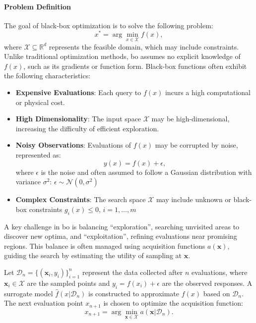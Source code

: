 \paragraph{Problem Definition}

The goal of black-box optimization is to solve the following problem:  
\[
x^* = \arg\min_{x \in \mathcal{X}} f(x),
\]  
where $\mathcal{X} \subseteq \mathbb{R}^d$ represents the feasible domain, which may include constraints. Unlike traditional optimization methods, \ac{bo} assumes no explicit knowledge of \( f(x) \), such as its gradients or function form.  Black-box functions often exhibit the following characteristics:  
\begin{itemize}
    \item \textbf{Expensive Evaluations}: Each query to \( f(x) \) incurs a high computational or physical cost. 
    \item \textbf{High Dimensionality}: The input space \( \mathcal{X} \) may be high-dimensional, increasing the difficulty of efficient exploration. 
    \item \textbf{Noisy Observations}: Evaluations of \( f(x) \) may be corrupted by noise, represented as:  
   \[
   y(x) = f(x) + \epsilon,
   \]  
   where $\epsilon$ is the noise and often assumed to follow a Gaussian distribution with variance $\sigma^2$: $\epsilon \sim \mathcal{N}(0, \sigma^2)$
\item \textbf{Complex Constraints}: The search space \( \mathcal{X} \) may include unknown or black-box constraints \( g_i(x) \leq 0 \), \( i = 1, \dots, m \)
\end{itemize}


A key challenge in \ac{bo} is balancing ``exploration'', searching unvisited areas to discover new optima, and ``exploitation'', refining evaluations near promising regions. This balance is often managed using acquisition functions \( a(\mathbf{x}) \), guiding the search by estimating the utility of sampling at \( \mathbf{x} \).  


Let \( \mathcal{D}_n = \{(\mathbf{x}_i, y_i)\}_{i=1}^n \) represent the data collected after \( n \) evaluations, where \( \mathbf{x}_i \in \mathcal{X} \) are the sampled points and \( y_i = f(x_i) + \epsilon \) are the observed responses. A surrogate model \( \hat{f}(x  \vert  \mathcal{D}_n) \) is constructed to approximate \( f(x) \) based on \( \mathcal{D}_n \). The next evaluation point \( x_{n+1} \) is chosen to optimize the acquisition function:  
\[
x_{n+1} = \arg\min_{\mathbf{x} \in \mathcal{X}} a(\mathbf{x} \vert \mathcal{D}_n).
\]  

